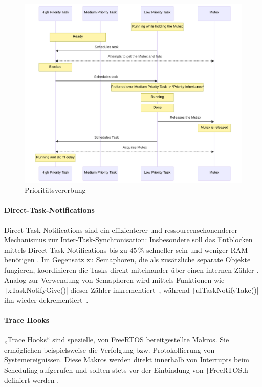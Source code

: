 \begin{figure}[H]
    \centering
    \includegraphics[width=1\textwidth]{assets/prio_inheritance}
    \caption{Prioritätsvererbung}
\end{figure}

\paragraph{Direct-Task-Notifications} \label{sec:direct_task_notification}

Direct-Task-Notifications sind ein effizienterer und ressourcenschonenderer
Mechanismus zur Inter-Task-Synchronisation: Insbesondere soll das Entblocken
mittels Direct-Task-Notifications bis zu $45\,\%$ schneller sein und weniger RAM
benötigen \cite{freertos_task_notifications_usage}. Im Gegensatz zu Semaphoren,
die als zusätzliche separate Objekte fungieren, koordinieren die Tasks direkt
miteinander über einen internen Zähler \cite{freertos_tasks_c_308}. Analog zur
Verwendung von Semaphoren wird mittels Funktionen wie
\texttt|xTaskNotifyGive()| dieser Zähler
inkrementiert~\cite{freertos_tasks_c_4990}, während
\texttt|ulTaskNotifyTake()| ihn wieder
dekrementiert~\cite{freertos_tasks_c_4614}.

\paragraph{Trace Hooks} \label{sec:trace_hooks}

„Trace Hooks“ sind spezielle, von FreeRTOS bereitgestellte Makros. Sie
ermöglichen beispielsweise die Verfolgung bzw. Protokollierung von
Systemereignissen. Diese Makros werden direkt innerhalb von Interrupts beim
Scheduling aufgerufen und sollten stets vor der Einbindung von
\texttt|FreeRTOS.h| definiert werden \cite{freertos_rtos_trace_hooks}.

